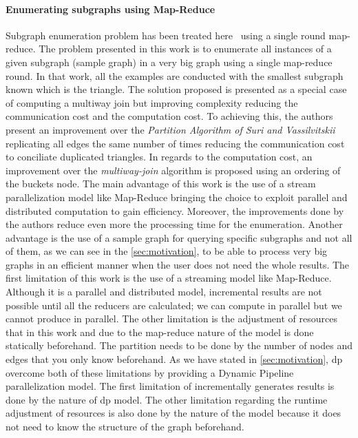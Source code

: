 \paragraph{Enumerating subgraphs using Map-Reduce} 
Subgraph enumeration problem has been treated here~\cite{enumeratingsg} using a single round map-reduce.
The problem presented in this work is to enumerate all instances of a given subgraph (sample graph) in a very big graph using a single map-reduce round. 
In that work, all the examples are conducted with the smallest subgraph known which is the triangle.
The solution proposed is presented as a special case of computing a multiway join but improving complexity reducing the communication cost and the computation cost.
To achieving this, the authors present an improvement over the \emph{Partition Algorithm of Suri and Vassilvitskii}~\cite{partitionalgo} replicating all edges the same number of times
reducing the communication cost to conciliate duplicated triangles. In regards to the computation cost, an improvement over the \emph{multiway-join} algorithm is proposed using an ordering of the buckets node. 
The main advantage of this work is the use of a stream parallelization model like Map-Reduce bringing the choice to exploit parallel and distributed computation to gain efficiency. 
Moreover, the improvements done by the authors reduce even more the processing time for the enumeration. Another advantage is the use of a sample graph for querying specific subgraphs and not all of them, 
as we can see in the \autoref{sec:motivation}, to be able to process very big graphs in an efficient manner when the user does not need the whole results.
The first limitation of this work is the use of a streaming model like Map-Reduce. Although it is a parallel and distributed model, incremental results are not possible until all the reducers are calculated; we can compute in parallel but we cannot produce in parallel.
The other limitation is the adjustment of resources that in this work and due to the map-reduce nature of the model is done statically beforehand. The partition needs to be done by the number of nodes and edges that you only know beforehand.
As we have stated in \autoref{sec:motivation}, \acrshort{dp} overcome both of these limitations by providing a Dynamic Pipeline parallelization model. The first limitation of incrementally generates results is done by the nature of \acrshort{dp} model. 
The other limitation regarding the runtime adjustment of resources is also done by the nature of the model because it does not need to know the structure of the graph beforehand. 

